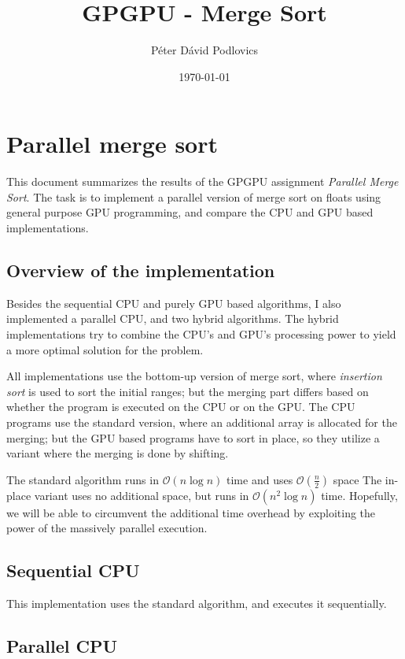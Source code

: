 \documentclass[10pt,a4paper]{article}
\title{GPGPU - Merge Sort}
\date{\today}
\author{Péter Dávid Podlovics}
\begin{document}
	
	\maketitle
	
	\section{Parallel merge sort}
	
	This document summarizes the results of the GPGPU assignment \textit{Parallel Merge Sort}. The task is to implement a parallel version of merge sort on floats using general purpose GPU programming, and compare the CPU and GPU based implementations.
	
	\subsection{Overview of the implementation}
	
	Besides the sequential CPU and purely GPU based algorithms, I also implemented a parallel CPU, and two hybrid algorithms. The hybrid implementations try to combine the CPU's and GPU's processing power to yield a more optimal solution for the problem.
	
	All implementations use the bottom-up version of merge sort, where \textit{insertion sort} is used to sort the initial ranges; but the merging part differs based on whether the program is executed on the CPU or on the GPU. The CPU programs use the standard version, where an additional array is allocated for the merging; but the GPU based programs have to sort in place, so they utilize a variant where the merging is done by shifting. 
	
	The standard algorithm runs in $\mathcal{O}(n\log{}n)$ time and uses $\mathcal{O}(\frac{n}{2})$ space The in-place variant uses no additional space, but runs in $\mathcal{O}(n^2\log{}n)$ time. Hopefully, we will be able to circumvent the additional time overhead by exploiting the power of the massively parallel execution.
	
	\subsection{Sequential CPU}
	
	This implementation uses the standard algorithm, and executes it sequentially.
	
	\subsection{Parallel CPU}
	
\end{document}
